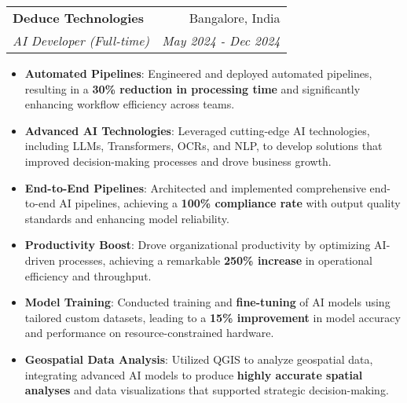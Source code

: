 \documentclass[a4paper,20pt]{article}
\makeatletter
\newcommand{\resumeItem}[2]{
  \item\small{
    \textbf{#1}{: #2 \vspace{-2pt}}
  }
}
\newcommand{\resumeCompanyHeading}[4]{
  \vspace{5pt}
    \begin{tabular*}{0.97\textwidth}{l@{\extracolsep{\fill}}r}
      \textbf{#1} & #2 \\
      \textit{#3} & \textit{#4} \\
    \end{tabular*}\vspace{-5pt}
}
\newcommand{\resumeItemListStart}{\begin{itemize}}
\newcommand{\resumeItemListEnd}{\end{itemize}\vspace{-5pt}}
\makeatother
\begin{document}
  \resumeCompanyHeading{Deduce Technologies}{Bangalore, India}
  {AI Developer (Full-time)}{May 2024 - Dec 2024}
  \resumeItemListStart
  \resumeItem{Automated Pipelines}
    {Engineered and deployed automated pipelines, resulting in a \textbf{30\% reduction in processing time} and significantly enhancing workflow efficiency across teams.}
  \resumeItem{Advanced AI Technologies}
    {Leveraged cutting-edge AI technologies, including LLMs, Transformers, OCRs, and NLP, to develop solutions that improved decision-making processes and drove business growth.}
  \resumeItem{End-to-End Pipelines}
    {Architected and implemented comprehensive end-to-end AI pipelines, achieving a \textbf{100\% compliance rate} with output quality standards and enhancing model reliability.}
  \resumeItem{Productivity Boost}
    {Drove organizational productivity by optimizing AI-driven processes, achieving a remarkable \textbf{250\% increase} in operational efficiency and throughput.}
  \resumeItem{Model Training}
    {Conducted training and \textbf{fine-tuning} of AI models using tailored custom datasets, leading to a \textbf{15\% improvement} in model accuracy and performance on resource-constrained hardware.}
  \resumeItem{Geospatial Data Analysis}
    {Utilized QGIS to analyze geospatial data, integrating advanced AI models to produce \textbf{highly accurate spatial analyses} and data visualizations that supported strategic decision-making.}
  \resumeItemListEnd

\vspace{-5pt}
\end{document}
